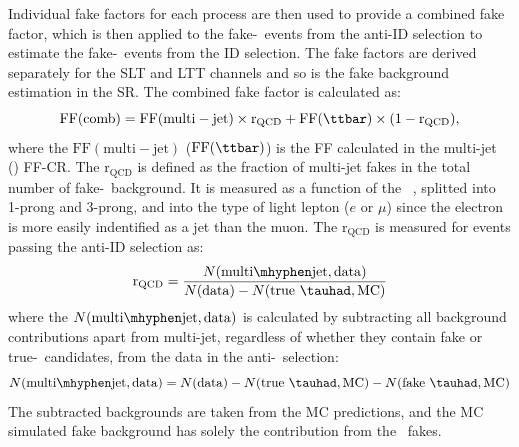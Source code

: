 Individual fake factors for each process
are then used to provide a combined fake factor,
which is then applied to the fake-\tauhad\ events 
from the anti-ID selection
to estimate the fake-\tauhad\ events from the ID selection.
The fake factors are derived separately for the SLT and LTT channels and
so is the fake background estimation in the SR.
The combined fake factor is calculated as:
\begin{equation}
	\mathrm{FF}(\mathrm{comb}) = \mathrm{FF}(\mathrm{multi-jet}) \times \mathrm{r}_{\mathrm{QCD}} + \mathrm{FF}(\ttbar) \times (1 - \mathrm{r}_{\mathrm{QCD}}),
\end{equation} 
where the $\mathrm{FF}(\mathrm{multi-jet})$ ($\mathrm{FF}(\ttbar)$) is the FF calculated in the multi-jet (\ttbar) FF-CR.
The $\mathrm{r}_{\mathrm{QCD}}$ is
defined as the fraction of multi-jet fakes
in the total number of fake-\tauhad\ background.
It is measured as a function of the \tauhad\ \pT, splitted 
into 1-prong and 3-prong, and into the type of light lepton ($e$ or $\mu$)
since the electron is more easily indentified as a jet than the muon.
The $\mathrm{r}_{\mathrm{QCD}}$ is measured for events passing the 
anti-ID selection as:
\begin{equation}
\mathrm{r}_{\mathrm{QCD}} = \frac{N(\mathrm{multi\mhyphen jet, data})} {N(\mathrm{data}) - N(\mathrm{true}~\tauhad, \mathrm{MC})}
\end{equation} 
where the $N(\mathrm{multi\mhyphen jet, data})$ is calculated by 
subtracting all background contributions apart from multi-jet, 
regardless of whether they contain fake or true-\tauhad\ candidates, 
from the data in the anti-\tauhad\ selection:
\begin{equation}
	N(\mathrm{multi\mhyphen jet, data}) = N(\mathrm{data}) - N(\mathrm{true}~\tauhad, \mathrm{MC}) - N(\mathrm{fake}~\tauhad, \mathrm{MC})
\end{equation}  
The subtracted backgrounds are taken from the MC predictions,
and the MC simulated fake background has solely the contribution from the
\ttbar\ fakes. 



